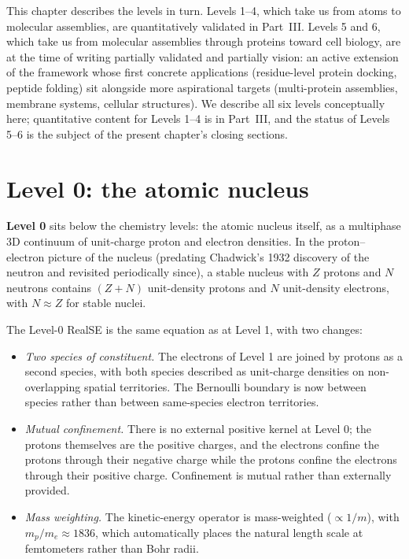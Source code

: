This chapter describes the levels in turn. Levels 1--4, which take us from atoms to molecular assemblies, are quantitatively validated in Part~III. Levels 5 and 6, which take us from molecular assemblies through proteins toward cell biology, are at the time of writing partially validated and partially vision: an active extension of the framework whose first concrete applications (residue-level protein docking, peptide folding) sit alongside more aspirational targets (multi-protein assemblies, membrane systems, cellular structures). We describe all six levels conceptually here; quantitative content for Levels 1--4 is in Part~III, and the status of Levels 5--6 is the subject of the present chapter's closing sections.

\section{Level 0: the atomic nucleus}\label{sec:level0}

\textbf{Level 0} sits below the chemistry levels: the atomic nucleus itself, as a multiphase 3D continuum of unit-charge proton and electron densities. In the proton--electron picture of the nucleus (predating Chadwick's 1932 discovery of the neutron and revisited periodically since), a stable nucleus with $Z$ protons and $N$ neutrons contains $(Z+N)$ unit-density protons and $N$ unit-density electrons, with $N \approx Z$ for stable nuclei.

The Level-0 RealSE is the same equation as at Level 1, with two changes:

\begin{itemize}
\item \emph{Two species of constituent.} The electrons of Level 1 are joined by protons as a second species, with both species described as unit-charge densities on non-overlapping spatial territories. The Bernoulli boundary is now between species rather than between same-species electron territories.
\item \emph{Mutual confinement.} There is no external positive kernel at Level 0; the protons themselves are the positive charges, and the electrons confine the protons through their negative charge while the protons confine the electrons through their positive charge. Confinement is mutual rather than externally provided.
\item \emph{Mass weighting.} The kinetic-energy operator is mass-weighted ($\propto 1/m$), with $m_p / m_e \approx 1836$, which automatically places the natural length scale at femtometers rather than Bohr radii.
\end{itemize}

